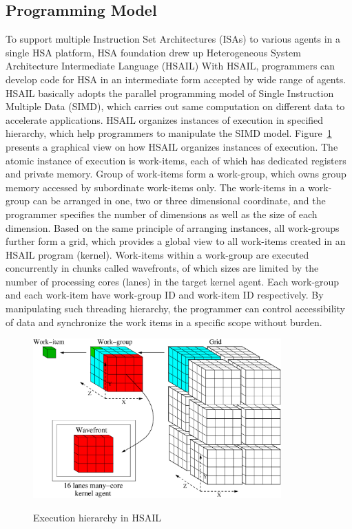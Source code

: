         \subsection{Programming Model}
        To support multiple Instruction Set Architectures (ISAs) to various agents in a single HSA platform,
        HSA foundation drew up Heterogeneous System Architecture Intermediate Language (HSAIL)
        With HSAIL, programmers can develop code for HSA in an intermediate form accepted by wide range of agents.
        HSAIL basically adopts the parallel programming model of Single Instruction Multiple Data (SIMD), 
        which carries out same computation on different data to accelerate applications.
        HSAIL organizes instances of execution in specified hierarchy, which help programmers to manipulate the SIMD model.
        Figure~\ref{fig:grid} presents a graphical view on how HSAIL organizes instances of execution.
        The atomic instance of execution is work-items, each of which has dedicated registers and private memory.
        Group of work-items form a work-group, which owns group memory accessed by subordinate work-items only.
        The work-items in a work-group can be arranged in one, two or three dimensional coordinate, 
        and the programmer specifies the number of dimensions as well as the size of each dimension.
        Based on the same principle of arranging instances, all work-groups further form a grid, 
        which provides a global view to all work-items created in an HSAIL program (kernel).
        Work-items within a work-group are executed concurrently in chunks called wavefronts, 
        of which sizes are limited by the number of processing cores (lanes) in the target kernel agent.
        Each work-group and each work-item have work-group ID and work-item ID respectively.
        By manipulating such threading hierarchy, 
        the programmer can control accessibility of data and synchronize the work items in a specific scope without burden.
        \begin{figure}[!ht] 
            \caption{Execution hierarchy in HSAIL}
            \centering
            \includegraphics[width=0.85\textwidth]{./figs/grid.eps}
            \label{fig:grid}
        \end{figure}
